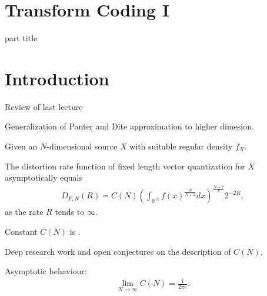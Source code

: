 
\DeclareMathOperator{\cwd}{codeword}
\newtheorem{proposition}{Proposition}
\usepackage{forest}
\usepackage{lipsum}
\usepackage{subcaption}
\usepackage{mathtools}
\DeclareMathOperator{\dist}{dist}
\DeclareMathOperator{\dimension}{dim}
\DeclareMathOperator{\gradient}{grad}

\section{Transform Coding I} 
\begin{frame}
 \vspace{12.0ex}
\begin{center}
\begin{beamercolorbox}[sep=12pt,center]{part title}
\insertsection\par
\end{beamercolorbox}
\end{center}
\end{frame}
\section{Introduction}
\begin{frame}{Review of last lecture}
\bit
\item  Generalization of Panter and Dite approximation to higher 
dimesion. 
\item Given an $N$-dimensional source $X$ with suitable regular density $f_X$. 
\item The distortion rate function of fixed length vector quantization for $X$  asymptotically equals 
\begin{align}\label{PanterDiteGen}
D_{F,N}(R)=C(N)\left(\int_{\mathbb{R}^N}f(x)^{\frac{N}{N+2}}dx\right)^{\frac{N+2}{N}}2^{-2R}, 
\end{align}
as the rate $R$ tends to $\infty$. 
\item Constant $C(N)$ is . 
\item Deep research work and open conjectures on the description of $C(N)$. 
\item Asymptotic behaviour: 
\begin{align}\label{CNasymptotic}
\lim_{N\to\infty}C(N)=\frac{1}{2\pi e}.
\end{align}
\eit
\end{frame}


